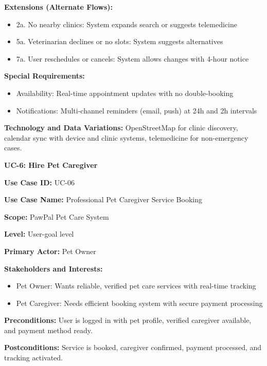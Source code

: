 \textbf{Extensions (Alternate Flows):}
\begin{itemize}
    \item 2a. No nearby clinics: System expands search or suggests telemedicine
    \item 5a. Veterinarian declines or no slots: System suggests alternatives
    \item 7a. User reschedules or cancels: System allows changes with 4-hour notice
\end{itemize}

\textbf{Special Requirements:}
\begin{itemize}
    \item Availability: Real-time appointment updates with no double-booking
    \item Notifications: Multi-channel reminders (email, push) at 24h and 2h intervals
\end{itemize}

\textbf{Technology and Data Variations:} OpenStreetMap for clinic discovery, calendar sync with device and clinic systems, telemedicine for non-emergency cases.

\textbf{UC-6: Hire Pet Caregiver}

\textbf{Use Case ID:} UC-06

\textbf{Use Case Name:} Professional Pet Caregiver Service Booking

\textbf{Scope:} PawPal Pet Care System

\textbf{Level:} User-goal level

\textbf{Primary Actor:} Pet Owner

\textbf{Stakeholders and Interests:}
\begin{itemize}
    \item Pet Owner: Wants reliable, verified pet care services with real-time tracking
    \item Pet Caregiver: Needs efficient booking system with secure payment processing
\end{itemize}

\textbf{Preconditions:} User is logged in with pet profile, verified caregiver available, and payment method ready.

\textbf{Postconditions:} Service is booked, caregiver confirmed, payment processed, and tracking activated.

